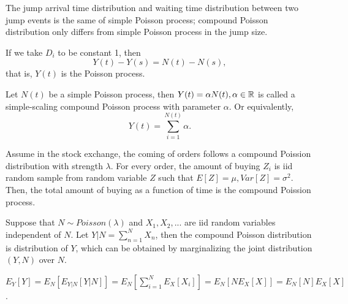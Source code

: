 \begin{refsection}
\begin{remark}[interpretation]
	The jump arrival time distribution and waiting time distribution between two jump events is the same of simple Poisson process; compound Poisson distribution only differs from simple Poisson process in the jump size. 	
\end{remark}




\begin{remark}
	If we take $D_i$ to be constant 1, then
	$$Y(t)-Y(s) = N(t) - N(s),$$
	that is, $Y(t)$ is the Poisson process.
\end{remark}

\begin{definition}
	Let $N(t)$ be a simple Poisson process, then $Y(t) = \alpha N(t), \alpha \in \mathbb{R}$ is called a simple-scaling compound Poisson process with parameter $\alpha$. 	
	Or equivalently, 
	$$Y(t) = \sum_{i=1}^{N(t)} \alpha.$$	
\end{definition}
\begin{example}
	
\end{example}

\begin{example}
	Assume in the stock exchange, the coming of orders follows a compound Poission distribution with strength $\lambda$. For every order, the amount of buying $Z_i$ is iid random sample from random variable $Z$ such that $E[Z] = \mu, Var[Z] = \sigma^2$. Then, the total amount of buying as a function of time is the compound Poission process. 
\end{example}

\begin{lemma}
	
\end{lemma}



\begin{definition}
	Suppose that 
	$N\sim Poisson(\lambda)$ and $X_1,X_2,...$ are iid random variables independent of $N$. Let $Y|N = \sum_{n=1}^N X_n$, then the compound Poisson distribution is distribution of $Y$, which can be obtained by marginalizing the joint distribution $(Y,N)$ over $N$. 
\end{definition}

\begin{lemma}
	$E_Y[Y] = E_N[E_{Y|N}[Y|N]] = E_N[\sum_{i=1}^N E_X[X_i]] = E_N[NE_X[X]] = E_N[N]E_X[X]$.
	

\end{lemma}
\end{refsection}
